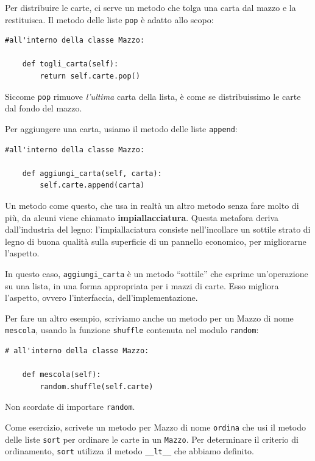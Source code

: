 \documentclass[10pt]{book}
\begin{document}
Per distribuire le carte, ci serve un metodo che tolga una carta dal mazzo e la restituisca. Il metodo delle liste {\tt pop} è adatto allo scopo:

\begin{verbatim}
#all'interno della classe Mazzo:

    def togli_carta(self):
        return self.carte.pop()
\end{verbatim}
%
Siccome {\tt pop} rimuove {\em l'ultima} carta della lista, è come se distribuissimo le carte dal fondo del mazzo.

Per aggiungere una carta, usiamo il metodo delle liste {\tt append}:

\begin{verbatim}
#all'interno della classe Mazzo:

    def aggiungi_carta(self, carta):
        self.carte.append(carta)
\end{verbatim}
%
Un metodo come questo, che usa in realtà un altro metodo senza fare molto di più, da alcuni viene chiamato {\bf impiallacciatura}.  Questa metafora deriva dall'industria del legno: l'impiallaciatura consiste nell'incollare un sottile strato di legno di buona qualità sulla superficie di un pannello economico, per migliorarne l'aspetto.

In questo caso, \verb"aggiungi_carta" è un metodo ``sottile'' che esprime un'operazione su una lista, in una forma appropriata per i mazzi di carte. Esso migliora l'aspetto, ovvero l'interfaccia, dell'implementazione.

Per fare un altro esempio, scriviamo anche un metodo per un Mazzo di nome {\tt mescola}, usando la funzione {\tt shuffle} contenuta nel modulo {\tt random}:

\begin{verbatim}
# all'interno della classe Mazzo:
            
    def mescola(self):
        random.shuffle(self.carte)
\end{verbatim}
%
Non scordate di importare {\tt random}.

Come esercizio, scrivete un metodo per Mazzo di nome {\tt ordina} che usi il metodo delle liste {\tt sort} per ordinare le carte in un {\tt Mazzo}. Per determinare il criterio di ordinamento, {\tt sort} utilizza il metodo \verb"__lt__" che abbiamo definito.
 
\end{document}
